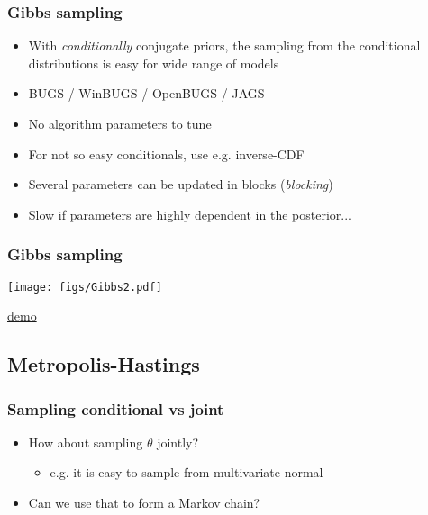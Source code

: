 \documentclass[10pt]{beamer}
\begin{document}
\begin{frame}

\frametitle{ Gibbs sampling}

  \vspace{-0.5\baselineskip}
  \begin{itemize}
  \item With {\it conditionally} conjugate priors, the sampling from
    the conditional distributions is easy for wide range of models
  \item<2-> BUGS / WinBUGS / OpenBUGS / JAGS
  \item<3-> No algorithm parameters to tune
  \item<4-> For not so easy conditionals, use  e.g. inverse-CDF
  \item<5-> Several parameters can be updated in blocks ({\em blocking})
  \item<6-> Slow if parameters are highly dependent in the posterior...
  \end{itemize}

\end{frame}

\begin{frame}
\frametitle{Gibbs sampling}

    \vspace{-.5\baselineskip}
     \begin{center}
       \texttt{[image: figs/Gibbs2.pdf]}
     \end{center}
    \vspace{-.5\baselineskip}
     \begin{center}
       \href{https://github.com/MansMeg/BSDA/blob/main/lectures/L5/figs/gibbs_example_correlated.gif}{demo}
     \end{center}
\end{frame}

\subsection{Metropolis-Hastings}

\begin{frame}

\frametitle{Sampling conditional vs joint}

  \begin{itemize}
  \item How about sampling $\theta$ jointly?
    \begin{itemize}
    \item e.g. it is easy to sample from multivariate normal
    \end{itemize}
    \item<2-> Can we use that to form a Markov chain?
  \end{itemize}

\end{frame}
\end{document}
